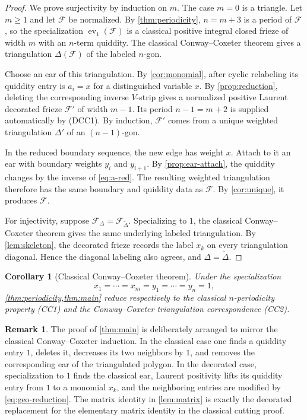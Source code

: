 \documentclass[amstex,11pt,reqno]{amsart}
\newtheorem{corollary}[theorem]{Corollary}
\theoremstyle{definition}
\newtheorem{remark}[theorem]{Remark}
\newcommand{\cF}{\mathcal F}
\newcommand{\ev}{\operatorname{ev}_1}
\begin{document}
\begin{proof}
We prove surjectivity by induction on $m$. The case $m=0$ is a triangle. Let $m\geq1$ and let $\cF$ be normalized. By \cref{thm:periodicity}, $n=m+3$ is a period of $\cF$, so the specialization $\ev(\cF)$ is a classical positive integral closed frieze of width $m$ with an $n$-term quiddity. The classical Conway--Coxeter theorem gives a triangulation $\Delta(\cF)$ of the labeled $n$-gon.

Choose an ear of this triangulation. By \cref{cor:monomial}, after cyclic relabeling its quiddity entry is $a_i=x$ for a distinguished variable $x$. By \cref{prop:reduction}, deleting the corresponding inverse $V$-strip gives a normalized positive Laurent decorated frieze $\cF'$ of width $m-1$. Its period $n-1=m+2$ is supplied automatically by (DCC1). By induction, $\cF'$ comes from a unique weighted triangulation $\Delta'$ of an $(n-1)$-gon.

In the reduced boundary sequence, the new edge has weight $x$. Attach to it an ear with boundary weights $y_i$ and $y_{i+1}$. By \cref{prop:ear-attach}, the quiddity changes by the inverse of \eqref{eq:a-red}. The resulting weighted triangulation therefore has the same boundary and quiddity data as $\cF$. By \cref{cor:unique}, it produces $\cF$.

For injectivity, suppose $\cF_\Delta=\cF_{\widetilde\Delta}$. Specializing to $1$, the classical Conway--Coxeter theorem gives the same underlying labeled triangulation. By \cref{lem:skeleton}, the decorated frieze records the label $x_k$ on every triangulation diagonal. Hence the diagonal labeling also agrees, and $\Delta=\widetilde\Delta$.
\end{proof}

\begin{corollary}[Classical Conway--Coxeter theorem]\label{cor:classical}
Under the specialization
\[
 x_1=\cdots=x_m=y_1=\cdots=y_n=1,
\]
\cref{thm:periodicity,thm:main} reduce respectively to the classical $n$-periodicity property (CC1) and the Conway--Coxeter triangulation correspondence (CC2).
\end{corollary}

\begin{remark}
\label{rem:classical-proof}
The proof of \cref{thm:main} is deliberately arranged to mirror the classical Conway--Coxeter induction. In the classical case one finds a quiddity entry $1$, deletes it, decreases its two neighbors by $1$, and removes the corresponding ear of the triangulated polygon. In the decorated case, specialization to $1$ finds the classical ear, Laurent positivity lifts its quiddity entry from $1$ to a monomial $x_k$, and the neighboring entries are modified by \eqref{eq:geo-reduction}. The matrix identity in \cref{lem:matrix} is exactly the decorated replacement for the elementary matrix identity in the classical cutting proof.
\end{remark}
\end{document}

